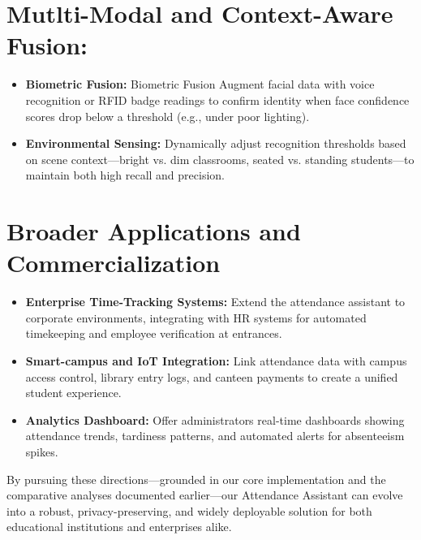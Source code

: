 \documentclass[openany]{report}
\begin{document}
\section{Mutlti-Modal and Context-Aware Fusion:}
\begin{itemize}
    \item \textbf{Biometric Fusion:} Biometric Fusion
    Augment facial data with voice recognition or RFID badge readings to confirm identity when face confidence scores drop below a threshold (e.g., under poor lighting).
    \item \textbf{Environmental Sensing:} Dynamically adjust recognition thresholds based on scene context—bright vs. dim classrooms, seated vs. standing students—to maintain both high recall and precision.
\end{itemize}

\section{Broader Applications and Commercialization}
\begin{itemize}
    \item \textbf{Enterprise Time-Tracking Systems:} Extend the attendance assistant to corporate environments, integrating with HR systems for automated timekeeping and employee verification at entrances.
    \item \textbf{Smart-campus and IoT Integration:} Link attendance data with campus access control, library entry logs, and canteen payments to create a unified student experience.
    \item \textbf{Analytics Dashboard:} Offer administrators real-time dashboards showing attendance trends, tardiness patterns, and automated alerts for absenteeism spikes.
\end{itemize}
By pursuing these directions—grounded in our core implementation and the comparative analyses documented earlier—our Attendance Assistant can evolve into a robust, privacy-preserving, and widely deployable solution for both educational institutions and enterprises alike.
\end{document}
